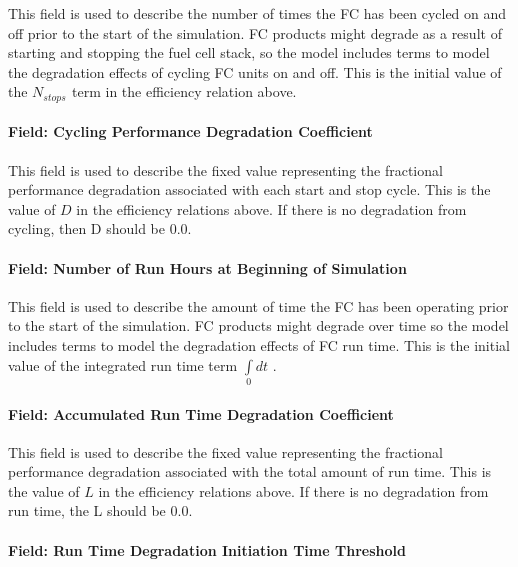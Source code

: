 This field is used to describe the number of times the FC has been cycled on and off prior to the start of the simulation. FC products might degrade as a result of starting and stopping the fuel cell stack, so the model includes terms to model the degradation effects of cycling FC units on and off. This is the initial value of the \({N_{stops}}\) \emph{\(_{}\)}term in the efficiency relation above.

\paragraph{Field: Cycling Performance Degradation Coefficient}\label{field-cycling-performance-degradation-coefficient}

This field is used to describe the fixed value representing the fractional performance degradation associated with each start and stop cycle. This is the value of \(D\) in the efficiency relations above. If there is no degradation from cycling, then D should be 0.0.

\paragraph{Field: Number of Run Hours at Beginning of Simulation}\label{field-number-of-run-hours-at-beginning-of-simulation}

This field is used to describe the amount of time the FC has been operating prior to the start of the simulation. FC products might degrade over time so the model includes terms to model the degradation effects of FC run time. This is the initial value of the integrated run time term \(\int\limits_0 {dt}\) .

\paragraph{Field: Accumulated Run Time Degradation Coefficient}\label{field-accumulated-run-time-degradation-coefficient}

This field is used to describe the fixed value representing the fractional performance degradation associated with the total amount of run time. This is the value of \(L\) in the efficiency relations above. If there is no degradation from run time, the L should be 0.0.

\paragraph{Field: Run Time Degradation Initiation Time Threshold}\label{field-run-time-degradation-initiation-time-threshold}

